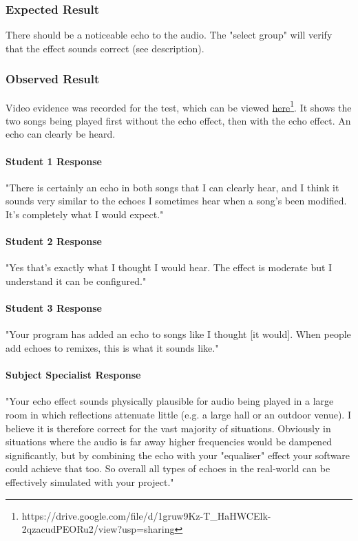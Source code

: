 \subsubsection*{Expected Result}
There should be a noticeable echo to the audio. The "select group" will verify that the effect sounds correct (see description).

\subsubsection*{Observed Result}
\label{sec:evidence4.1}
Video evidence was recorded for the test, which can be viewed \href{https://drive.google.com/file/d/1gruw9Kz-T_HaHWCElk-2qzacudPEORu2/view?usp=sharing}{here}\footnote{
	https://drive.google.com/file/d/1gruw9Kz-T\_HaHWCElk-2qzacudPEORu2/view?usp=sharing
}. It shows the two songs being played first without the echo effect, then with the echo effect. An echo can clearly be heard.

\paragraph{Student 1 Response}
"There is certainly an echo in both songs that I can clearly hear, and I think it sounds very similar to the echoes I sometimes hear when a song's been modified. It's completely what I would expect."

\paragraph{Student 2 Response}
"Yes that's exactly what I thought I would hear. The effect is moderate but I understand it can be configured."

\paragraph{Student 3 Response}
"Your program has added an echo to songs like I thought [it would]. When people add echoes to remixes, this is what it sounds like."

\paragraph{Subject Specialist Response}
"Your echo effect sounds physically plausible for audio being played in a large room in which reflections attenuate little (e.g. a large hall or an outdoor venue). I believe it is therefore correct for the vast majority of situations. Obviously in situations where the audio is far away higher frequencies would be dampened significantly, but by combining the echo with your "equaliser" effect your software could achieve that too. So overall all types of echoes in the real-world can be effectively simulated with your project."

